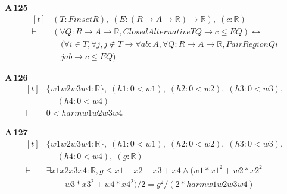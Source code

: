 \noindent\textbf{A\,125}\quad{}
{\footnotesize\[ \begin{aligned}[t]
&(\mathit{T} : \mathit{Finset} \mathit{R}),\; (\mathit{E} : (\mathit{R} \to \mathit{A} \to \mathbb{R} ) \to \mathbb{R} ),\; (\mathit{c} : \mathbb{R} )\\
\vdash\;&(\forall \mathit{Q} : \mathit{R} \to \mathit{A} \to \mathbb{R} , \mathit{ClosedAlternative} \mathit{T} \mathit{Q} \to \mathit{c} \leq \mathit{E} \mathit{Q}) \leftrightarrow\\
&\quad (\forall \mathit{i} \in \mathit{T}, \forall \mathit{j}, \mathit{j} \notin \mathit{T} \to \forall \mathit{a} \mathit{b} : \mathit{A}, \forall \mathit{Q} : \mathit{R} \to \mathit{A} \to \mathbb{R} , \mathit{PairRegion} \mathit{Q} \mathit{i}\\
&\quad \mathit{j} \mathit{a} \mathit{b} \to \mathit{c} \leq \mathit{E} \mathit{Q})
\end{aligned} \]}

\noindent\textbf{A\,126}\quad{}
{\footnotesize\[ \begin{aligned}[t]
&\{ \mathit{w1} \mathit{w2} \mathit{w3} \mathit{w4} : \mathbb{R} \},\; (\mathit{h1} : 0 < \mathit{w1}),\; (\mathit{h2} : 0 < \mathit{w2}),\; (\mathit{h3} : 0 < \mathit{w3}),\\
&\quad \; (\mathit{h4} : 0 < \mathit{w4})\\
\vdash\;&0 < \mathit{harm} \mathit{w1} \mathit{w2} \mathit{w3} \mathit{w4}
\end{aligned} \]}

\noindent\textbf{A\,127}\quad{}
{\footnotesize\[ \begin{aligned}[t]
&\{ \mathit{w1} \mathit{w2} \mathit{w3} \mathit{w4} : \mathbb{R} \},\; (\mathit{h1} : 0 < \mathit{w1}),\; (\mathit{h2} : 0 < \mathit{w2}),\; (\mathit{h3} : 0 < \mathit{w3}),\\
&\quad \; (\mathit{h4} : 0 < \mathit{w4}),\; (\mathit{g} : \mathbb{R} )\\
\vdash\;&\exists \mathit{x1} \mathit{x2} \mathit{x3} \mathit{x4} : \mathbb{R} , \mathit{g} \leq \mathit{x1} - \mathit{x2} - \mathit{x3} + \mathit{x4} \wedge (\mathit{w1}*\mathit{x1}^{2} + \mathit{w2}*\mathit{x2}^{2}\\
&\quad + \mathit{w3}*\mathit{x3}^{2} + \mathit{w4}*\mathit{x4}^{2}) / 2 = \mathit{g} ^{2} / (2 * \mathit{harm} \mathit{w1} \mathit{w2} \mathit{w3} \mathit{w4})
\end{aligned} \]}

